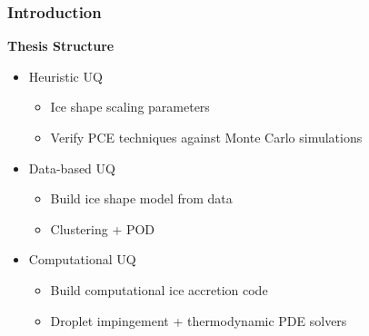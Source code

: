 \documentclass[9pt]{beamer}
\begin{document}
\begin{frame}
\frametitle{Introduction}
\label{sec-1-9}

\textbf{Thesis Structure}
\begin{itemize}
\item Heuristic UQ
\begin{itemize}
\item Ice shape scaling parameters
\item Verify PCE techniques against Monte Carlo simulations
\end{itemize}
\item Data-based UQ
\begin{itemize}
\item Build ice shape model from data
\item Clustering + POD
\end{itemize}
\item Computational UQ
\begin{itemize}
\item Build computational ice accretion code
\item Droplet impingement + thermodynamic PDE solvers
\end{itemize}
\end{itemize}
\end{frame}
\end{document}

